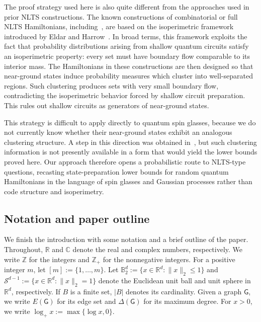 \documentclass[12pt]{article}
\newcommand{\C}{\mathbb{C}}
\newcommand{\R}{\mathbb{R}}
\newcommand{\Z}{\mathbb{Z}}
\newcommand{\B}{\mathbb{B}}
\newcommand{\mcS}{\mathcal{S}}
\begin{document}
The proof strategy used here is also quite different from the approaches used in prior NLTS constructions. The known constructions of combinatorial or full NLTS Hamiltonians, including~\cite{eldar2017local,anshu2022construction,anshu2023nlts,anschuetz2024combinatorial}, are based on the isoperimetric framework introduced by Eldar and Harrow~\cite{eldar2017local}. In broad terms, this framework exploits the fact that probability distributions arising from shallow quantum circuits satisfy an isoperimetric property: every set must have boundary flow comparable to its interior mass. The Hamiltonians in these constructions are then designed so that near-ground states induce probability measures which cluster into well-separated regions. Such clustering produces sets with very small boundary flow, contradicting the isoperimetric behavior forced by shallow circuit preparation. This rules out shallow circuits as generators of near-ground states.

This strategy is difficult to apply directly to quantum spin glasses, because we do not currently know whether their near-ground states exhibit an analogous clustering structure. A step in this direction was obtained in~\cite{anschuetz2026quantum}, but such clustering information is not presently available in a form that would yield the lower bounds proved here. Our approach therefore opens a probabilistic route to NLTS-type questions, recasting state-preparation lower bounds for random quantum Hamiltonians in the language of spin glasses and Gaussian processes rather than code structure and isoperimetry.





\subsection{Notation and paper outline}

We finish the introduction with some notation and a brief outline of the paper.
Throughout, \(\R\) and \(\C\) denote the real and complex numbers, respectively. We write
\(\Z\) for the integers and \(\Z_+\) for the nonnegative integers. For a
positive integer \(m\), let \([m]:=\{1,\ldots,m\}\). Let $\B_2^d:=\{x\in\R^d:\|x\|_2\le 1\}$ and $\mcS^{d-1}:=\{x\in\R^d:\|x\|_2=1\}$ denote the Euclidean unit ball and unit sphere in $\mathbb{R}^d$, respectively. If \(B\) is a finite set, \(|B|\) denotes its cardinality. Given a graph \(\mathsf G\), we write \(E(\mathsf G)\) for its edge set and
\(\Delta(\mathsf G)\) for its maximum degree. For \(x>0\), we write \(\log_+ x:=\max\{\log x,0\}\).
\end{document}
